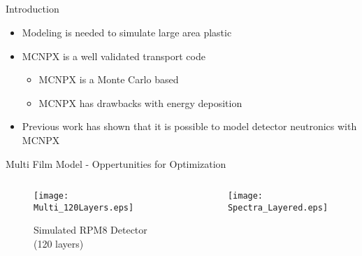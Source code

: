 \subsection*{}
\begin{frame}{Introduction}
  \large
  \vspace{1cm}
  \normalsize
  \begin{itemize}
    \item Modeling is needed to simulate large area plastic
    \item MCNPX is a well validated transport code
    \begin{itemize}
        \item MCNPX is a Monte Carlo based
        \item MCNPX has drawbacks with energy deposition
    \end{itemize}
    \item Previous work has shown that it is possible to model detector neutronics with MCNPX
  \end{itemize}
\end{frame}
\begin{frame}{Multi Film Model - Oppertunities for Optimization}
  \begin{columns}[onlytextwidth]
    \begin{column}{0.49\textwidth}
	    \begin{figure}
        \centering
        \texttt{[image: Multi\_120Layers.eps]}
        \caption{Simulated RPM8 Detector (120 layers)}
      \end{figure}
    \end{column}
    \begin{column}{0.49\textwidth}
      \begin{figure}
        \centering
        \texttt{[image: Spectra\_Layered.eps]}
      \end{figure}
    \end{column}
  \end{columns}
\end{frame}
